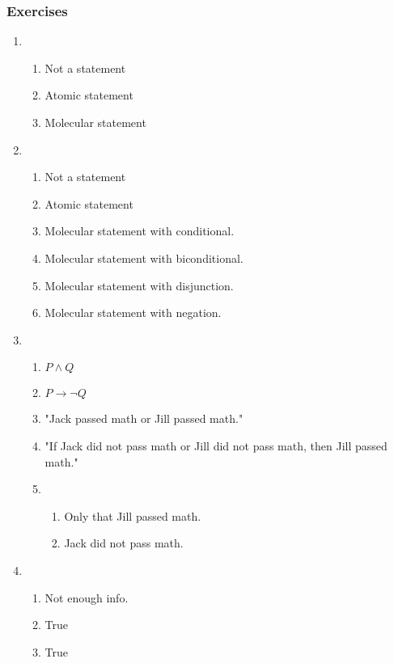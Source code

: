 \subsubsection{Exercises}
\begin{enumerate}
    \item 
        \begin{enumerate}
            \item Not a statement
            \item Atomic statement
            \item Molecular statement
        \end{enumerate}
    \item
        \begin{enumerate}
            \item Not a statement
            \item Atomic statement
            \item Molecular statement with conditional.
            \item Molecular statement with biconditional.
            \item Molecular statement with disjunction.
            \item Molecular statement with negation.
        \end{enumerate}
    \item
        \begin{enumerate}
            \item $P \wedge Q$
            \item $P \rightarrow \neg Q$
            \item "Jack passed math or Jill passed math."
            \item "If Jack did not pass math or Jill did not pass math, then Jill passed math."
            \item 
                \begin{enumerate}
                    \item Only that Jill passed math.
                    \item Jack did not pass math.
                \end{enumerate}
        \end{enumerate}
    \item
        \begin{enumerate}
            \item Not enough info.
            \item True
            \item True

\end{enumerate}
\end{enumerate}
